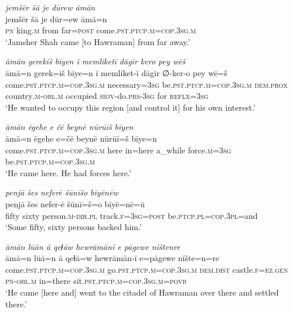 \ea \label{DP.4}
\textit{jemšēr šā je dūrew āmān} \\ 
\gll jemšēr šā je dūr=ew āmā=n \\ 
 \textsc{pn} king\textsc{.m} from far\textsc{=\textsc{post}} come\textsc{.pst}\textsc{.ptcp}\textsc{.m}\textsc{=cop}\textsc{.3sg}\textsc{.m} \\ 
\glt `Jamsher Shah came [to Hawraman] from far away.'
\z 
 
\ea \label{DP.5}
\textit{āmān gerekiš bīyen ī memliketī dāgīr kero pey wēš} \\ 
\gll āmā=n gerek=iš bīye=n ī memliket-ī dāgīr ∅-ker-o pey wē=š \\ 
 come\textsc{.pst}\textsc{.ptcp}\textsc{.m}\textsc{=cop}\textsc{.3sg}\textsc{.m} necessary\textsc{=3sg} be\textsc{.pst}\textsc{.ptcp}\textsc{.m}\textsc{=cop}\textsc{.3sg}\textsc{.m} \textsc{dem.prox} country\textsc{.m}\textsc{-obl}\textsc{.m} occupied \textsc{sbjv-}do\textsc{.prs}\textsc{-3sg} for \textsc{reflx}\textsc{=3sg} \\ 
\glt `He wanted to occupy this region [and control it] for his own interest.'
\z 
 
\ea \label{DP.7}
\textit{āmān ēgehe e čē beynē nūrūīš bīyen} \\ 
\gll āmā=n ēgehe e=čē beynē nūrūī=š bīye=n \\ 
 come\textsc{.pst}\textsc{.ptcp}\textsc{.m}\textsc{=cop}\textsc{.3sg}\textsc{.m} here in=here a\_while force\textsc{.m}\textsc{=3sg} be\textsc{.pst}\textsc{.ptcp}\textsc{.m}\textsc{=cop}\textsc{.3sg}\textsc{.m} \\ 
\glt `He came here. He had forces here.'
\z 
 
\ea \label{DP.8}
\textit{penjā šes neferē šūnīšo bīyēnēw} \\ 
\gll penjā šes nefer-ē šūnī=š=o bīyē=nē=ū \\ 
 fifty sixty person\textsc{.m}\textsc{-dir}\textsc{.pl} track\textsc{\textsc{.f}}\textsc{=3sg}\textsc{=\textsc{post}} be\textsc{.ptcp}\textsc{.pl}\textsc{=cop}\textsc{.3pl}=and \\ 
\glt `Some fifty, sixty persons backed him.'
\z 
 
\ea \label{DP.9}
\textit{āmān lūān ā qeɫāw hewrāmānī e pāgewe nīštenre} \\ 
\gll āmā=n lūā=n ā qeɫā=w hewrāmān-ī e=pāgewe nīšte=n=re \\ 
 come\textsc{.pst}\textsc{.ptcp}\textsc{.m}\textsc{=cop}\textsc{.3sg}\textsc{.m} go\textsc{.pst}\textsc{.ptcp}\textsc{.m}\textsc{=cop}\textsc{.3sg}\textsc{.m} \textsc{dem.dist} castle\textsc{\textsc{.f}}\textsc{=ez}\textsc{.gen} \textsc{pn}\textsc{-obl}\textsc{.m} in=there sit\textsc{.pst}\textsc{.ptcp}\textsc{.m}\textsc{=cop}\textsc{.3sg}\textsc{.m}\textsc{=\textsc{povb}} \\ 
\glt `He came [here and] went to the citadel of Hawraman over there and settled there.'
\z 
 
